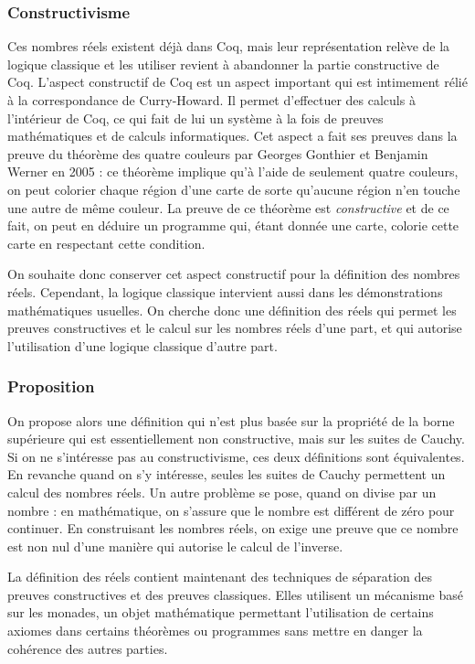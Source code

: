 \documentclass[11pt]{article}
\begin{document}
\subsubsection{Constructivisme}

Ces nombres réels existent déjà dans Coq, mais leur représentation relève de la
logique classique et les utiliser revient à abandonner la partie constructive de
Coq. L'aspect constructif de Coq est un aspect important qui est intimement rélié
à la correspondance de Curry-Howard. Il permet d'effectuer des calculs à l'intérieur
de Coq, ce qui fait de lui un système à la fois de preuves mathématiques et de
calculs informatiques. Cet aspect a fait ses preuves dans la preuve du théorème
des quatre couleurs par Georges Gonthier et Benjamin Werner en 2005 : ce théorème
implique qu'à l'aide de seulement quatre couleurs, on peut colorier chaque région
d'une carte de sorte qu'aucune région n'en touche une autre de même couleur. La
preuve de ce théorème est \emph{constructive} et de ce fait, on peut en déduire
un programme qui, étant donnée une carte, colorie cette carte en respectant cette
condition.

On souhaite donc conserver cet aspect constructif pour la définition des nombres
réels. Cependant, la logique classique intervient aussi dans les démonstrations
mathématiques usuelles. On cherche donc une définition des réels qui permet les
preuves constructives et le calcul sur les nombres réels d'une part, et qui autorise
l'utilisation d'une logique classique d'autre part.

\subsubsection{Proposition}

On propose alors une définition qui n'est plus basée sur la propriété de la borne 
supérieure qui est essentiellement non constructive, mais sur les suites de Cauchy. 
Si on ne s'intéresse pas au constructivisme, ces deux définitions sont équivalentes.
En revanche quand on s'y intéresse, seules les suites de Cauchy permettent un calcul
des nombres réels. Un autre problème se pose, quand on divise par un nombre : en
mathématique, on s'assure que le nombre est différent de zéro pour continuer.
En construisant les nombres réels, on exige une preuve que ce nombre est non nul
d'une manière qui autorise le calcul de l'inverse.

La définition des réels contient maintenant des techniques de séparation des preuves
constructives et des preuves classiques. Elles utilisent un mécanisme basé sur les
monades, un objet mathématique permettant l'utilisation de certains axiomes dans
certains théorèmes ou programmes sans mettre en danger la cohérence des autres parties.
\end{document}
